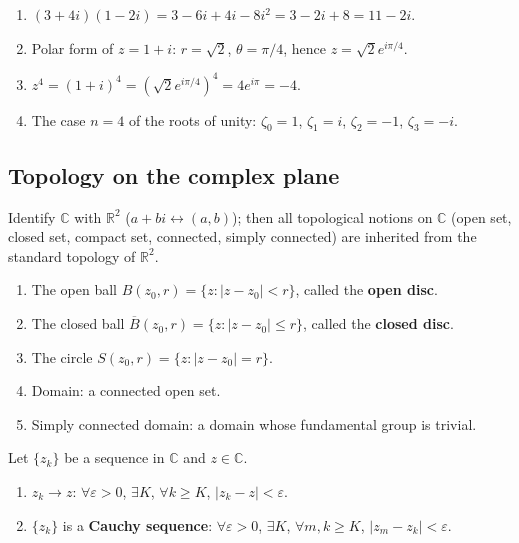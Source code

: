 \begin{example}\label{ex:ca_complex_examples}
\begin{enumerate}[label=(\roman*)]
    \item $(3+4i)(1-2i) = 3 - 6i + 4i - 8i^2 = 3 - 2i + 8 = 11 - 2i$.
    \item Polar form of $z = 1 + i$: $r = \sqrt{2}$, $\theta = \pi/4$, hence $z = \sqrt{2} e^{i\pi/4}$.
    \item $z^4 = (1+i)^4 = (\sqrt{2} e^{i\pi/4})^4 = 4 e^{i\pi} = -4$.
    \item The case $n = 4$ of the roots of unity: $\zeta_0 = 1$, $\zeta_1 = i$, $\zeta_2 = -1$, $\zeta_3 = -i$.
\end{enumerate}
\end{example}

\subsection{Topology on the complex plane}

\begin{definition}\label{def:ca_topology}
Identify $\mathbb{C}$ with $\mathbb{R}^2$ ($a + bi \leftrightarrow (a, b)$); then all topological notions on $\mathbb{C}$ (open set, closed set, compact set, connected, simply connected) are inherited from the standard topology of $\mathbb{R}^2$.
\begin{enumerate}[label=(\roman*)]
    \item The open ball $B(z_0, r) = \{z : |z - z_0| < r\}$, called the \textbf{open disc}.
    \item The closed ball $\overline{B}(z_0, r) = \{z : |z - z_0| \le r\}$, called the \textbf{closed disc}.
    \item The circle $S(z_0, r) = \{z : |z - z_0| = r\}$.
    \item Domain: a connected open set.
    \item Simply connected domain: a domain whose fundamental group is trivial.
\end{enumerate}
\end{definition}

\begin{definition}\label{def:ca_seq_convergence}
Let $\{z_k\}$ be a sequence in $\mathbb{C}$ and $z \in \mathbb{C}$.
\begin{enumerate}[label=(\roman*)]
    \item $z_k \to z$: $\forall \varepsilon > 0$, $\exists K$, $\forall k \ge K$, $|z_k - z| < \varepsilon$.
    \item $\{z_k\}$ is a \textbf{Cauchy sequence}: $\forall \varepsilon > 0$, $\exists K$, $\forall m, k \ge K$, $|z_m - z_k| < \varepsilon$.
\end{enumerate}
\end{definition}

